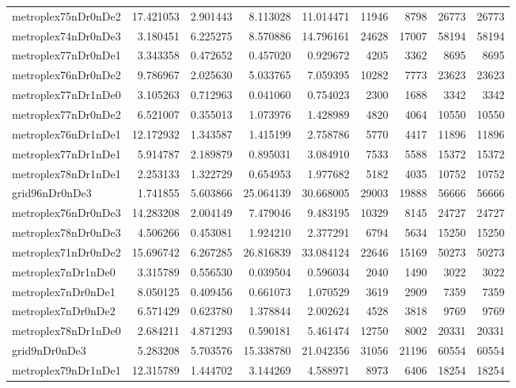 \begin{longtable}{|l|r|r|r|r|r|r|r|r|}
metroplex75nDr0nDe2 & 17.421053 & 2.901443 & 8.113028 & 11.014471 & 11946 & 8798 & 26773 & 26773 \\
metroplex74nDr0nDe3 & 3.180451 & 6.225275 & 8.570886 & 14.796161 & 24628 & 17007 & 58194 & 58194 \\
metroplex77nDr0nDe1 & 3.343358 & 0.472652 & 0.457020 & 0.929672 & 4205 & 3362 & 8695 & 8695 \\
metroplex76nDr0nDe2 & 9.786967 & 2.025630 & 5.033765 & 7.059395 & 10282 & 7773 & 23623 & 23623 \\
metroplex77nDr1nDe0 & 3.105263 & 0.712963 & 0.041060 & 0.754023 & 2300 & 1688 & 3342 & 3342 \\
metroplex77nDr0nDe2 & 6.521007 & 0.355013 & 1.073976 & 1.428989 & 4820 & 4064 & 10550 & 10550 \\
metroplex76nDr1nDe1 & 12.172932 & 1.343587 & 1.415199 & 2.758786 & 5770 & 4417 & 11896 & 11896 \\
metroplex77nDr1nDe1 & 5.914787 & 2.189879 & 0.895031 & 3.084910 & 7533 & 5588 & 15372 & 15372 \\
metroplex78nDr1nDe1 & 2.253133 & 1.322729 & 0.654953 & 1.977682 & 5182 & 4035 & 10752 & 10752 \\
grid96nDr0nDe3 & 1.741855 & 5.603866 & 25.064139 & 30.668005 & 29003 & 19888 & 56666 & 56666 \\
metroplex76nDr0nDe3 & 14.283208 & 2.004149 & 7.479046 & 9.483195 & 10329 & 8145 & 24727 & 24727 \\
metroplex78nDr0nDe3 & 4.506266 & 0.453081 & 1.924210 & 2.377291 & 6794 & 5634 & 15250 & 15250 \\
metroplex71nDr0nDe2 & 15.696742 & 6.267285 & 26.816839 & 33.084124 & 22646 & 15169 & 50273 & 50273 \\
metroplex7nDr1nDe0 & 3.315789 & 0.556530 & 0.039504 & 0.596034 & 2040 & 1490 & 3022 & 3022 \\
metroplex7nDr0nDe1 & 8.050125 & 0.409456 & 0.661073 & 1.070529 & 3619 & 2909 & 7359 & 7359 \\
metroplex7nDr0nDe2 & 6.571429 & 0.623780 & 1.378844 & 2.002624 & 4528 & 3818 & 9769 & 9769 \\
metroplex78nDr1nDe0 & 2.684211 & 4.871293 & 0.590181 & 5.461474 & 12750 & 8002 & 20331 & 20331 \\
grid9nDr0nDe3 & 5.283208 & 5.703576 & 15.338780 & 21.042356 & 31056 & 21196 & 60554 & 60554 \\
metroplex79nDr1nDe1 & 12.315789 & 1.444702 & 3.144269 & 4.588971 & 8973 & 6406 & 18254 & 18254 \\

\end{longtable}
